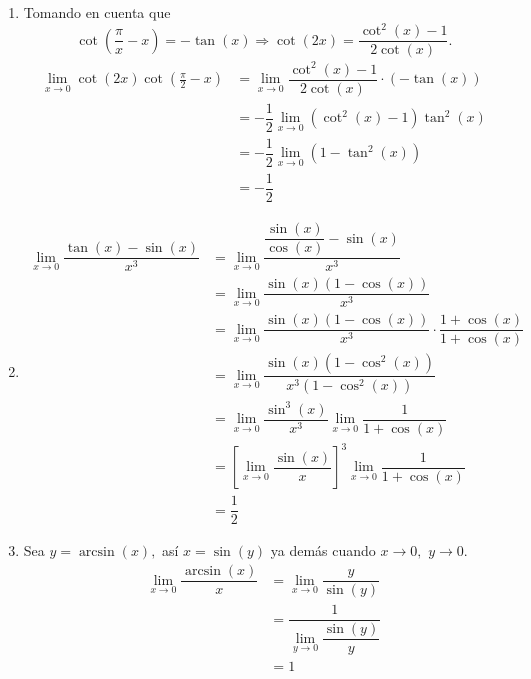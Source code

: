 \begin{example}
\begin{enumerate}
		\item Tomando en cuenta que
		\[\cot\left(\dfrac{\pi}{x}-x\right)=-\tan(x)\Rightarrow\cot\left(2x\right)=\dfrac{\cot^2(x)-1}{2\cot(x)}.\]
		\begin{align*}
		\lim\limits_{x\to 0}\cot(2x)\cot\left(\frac{\pi}{2}-x\right)&=\lim\limits_{x\to 0}\dfrac{\cot^2(x)-1}{2\cot(x)}\cdot\left(-\tan(x)\right)\\
		&=-\dfrac{1}{2}\lim\limits_{x\to 0}\left(\cot^2(x)-1\right)\tan^2(x)\\
		&=-\dfrac{1}{2}\lim\limits_{x\to 0}\left(1-\tan^2(x)\right)\\
		&=-\dfrac{1}{2}
		\end{align*}
		
		\item \begin{align*}
		\lim\limits_{x\to 0}\dfrac{\tan(x)-\sin(x)}{x^3}&=\lim\limits_{x\to 0}\dfrac{\dfrac{\sin(x)}{\cos(x)}-\sin(x)}{x^3}\\
		&=\lim\limits_{x\to 0}\dfrac{\sin(x)\left(1-\cos(x)\right)}{x^3}\\
		&=\lim\limits_{x\to 0}\dfrac{\sin(x)\left(1-\cos(x)\right)}{x^3}\cdot\dfrac{1+\cos(x)}{1+\cos(x)}\\
		&=\lim\limits_{x\to 0}\dfrac{\sin(x)(1-\cos^2(x))}{x^3\left(1-\cos^2(x)\right)}\\
		&=\lim\limits_{x\to 0}\dfrac{\sin^3(x)}{x^3}\lim\limits_{x\to 0}\dfrac{1}{1+\cos(x)}\\
		&=\left[\lim\limits_{x\to 0}\dfrac{\sin(x)}{x}\right]^3\lim\limits_{x\to 0}\dfrac{1}{1+\cos(x)}\\
		&=\dfrac{1}{2}
		\end{align*}
		
		\item Sea \(y=\arcsin(x),\) as\'i \(x=\sin(y)\) ya dem\'as cuando \(x\to 0,\) \(y\to 0.\)
		\begin{align*}
		\lim\limits_{x\to 0}\dfrac{\arcsin(x)}{x}&=\lim\limits_{x\to 0}\dfrac{y}{\sin(y)}\\
		&=\dfrac{1}{\lim\limits_{y\to 0}\dfrac{\sin(y)}{y}}\\
		&=1
		\end{align*}
		

\end{enumerate}
\end{example}

